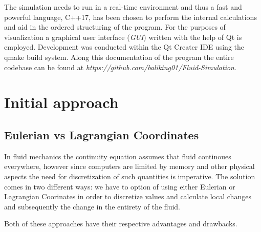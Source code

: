 \documentclass[12pt, titlepage]{article}
\begin{document}
The simulation needs to run in a real-time environment and thus a fast and powerful language, C++17, has been chosen to perform the internal calculations and aid in the ordered structuring of the program. For the purposes of visualization a graphical user interface (\textit{GUI}) written with the help of Qt is employed. Development was conducted within the Qt Creater IDE using the qmake build system. Along this documentation of the program the entire codebase can be found at \textit{https://github.com/baliking01/Fluid-Simulation}.

\pagebreak

\section{Initial approach}

\subsection{Eulerian vs Lagrangian Coordinates}
In fluid mechanics the continuity equation assumes that fluid continoues everywhere, however since computers are limited by memory and other physical aspects the need for discretization of such quantities is imperative. The solution comes in two different ways: we have to option of using either Eulerian or Lagrangian Coorinates in order to discretize values and calculate local changes and subsequently the change in the entirety of the fluid.

Both of these approaches have their respective advantages and drawbacks.

\begin{figure}[b]
\centering
\begin{minipage}{.5\textwidth}
  \centering
  \label{fig:grid}
\end{minipage}%
\begin{minipage}{.5\textwidth}
  \centering
  \label{fig:particle}
\end{minipage}
\end{figure}
\end{document}
